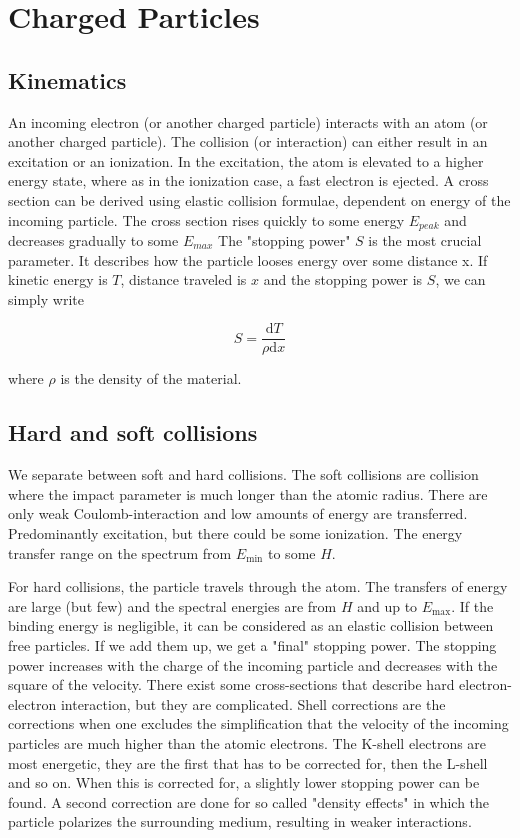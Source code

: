 \section{Charged Particles}

\subsection{Kinematics}

An incoming electron (or another charged particle) interacts with an atom (or another charged particle). 
The collision (or interaction) can either result in an excitation or an ionization. 
In the excitation, the atom is elevated to a higher energy state, where as in the ionization case, a fast electron is ejected.
A cross section can be derived using elastic collision formulae, dependent on energy of the incoming particle.
The cross section rises quickly to some energy $E_{peak}$ and decreases gradually to some $E_{max}$
The "stopping power" $S$ is the most crucial parameter.
It describes how the particle looses energy over some distance x.
If kinetic energy is $T$, distance traveled is $x$ and the stopping power is $S$, we can simply write

\begin{equation}
    S = \frac{\mathrm{d}T}{\rho \mathrm{d}x}
\end{equation}

where $\rho$ is the density of the material.

\subsection{Hard and soft collisions}

We separate between soft and hard collisions. 
The soft collisions are collision where the impact parameter is much longer than the atomic radius. 
There are only weak Coulomb-interaction and low amounts of energy are transferred.
Predominantly excitation, but there could be some ionization.
The energy transfer range on the spectrum from $E_{\mathrm{min}}$ to some $H$.

For hard collisions, the particle travels through the atom.
The transfers of energy are large (but few) and the spectral energies are from $H$ and up to $E_{\mathrm{max}}$.
If the binding energy is negligible, it can be considered as an elastic collision between free particles.
If we add them up, we get a "final" stopping power. 
The stopping power increases with the charge of the incoming particle and decreases with the square of the velocity.
There exist some cross-sections that describe hard electron-electron interaction, but they are complicated.
Shell corrections are the corrections when one excludes the simplification that the velocity of the incoming particles are much higher than the atomic electrons.
The K-shell electrons are most energetic, they are the first that has to be corrected for, then the L-shell and so on.
When this is corrected for, a slightly lower stopping power can be found.
A second correction are done for so called "density effects" in which the particle polarizes the surrounding medium, resulting in weaker interactions.

